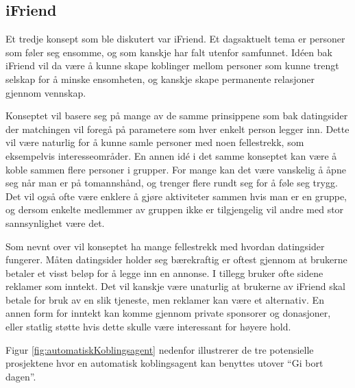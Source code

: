 \subsection{iFriend}
Et tredje konsept som ble diskutert var iFriend. Et dagsaktuelt tema er personer som føler seg ensomme, og som kanskje har falt utenfor samfunnet. Idéen bak iFriend vil da være å kunne skape koblinger mellom personer som kunne trengt selskap for å minske ensomheten, og kanskje skape permanente relasjoner gjennom vennskap.

Konseptet vil basere seg på mange av de samme prinsippene som bak datingsider der matchingen vil foregå på parametere som hver enkelt person legger inn. Dette vil være naturlig for å kunne samle personer med noen fellestrekk, som eksempelvis interesseområder. En annen idé i det samme konseptet kan være å koble sammen flere personer i grupper. For mange kan det være vanskelig å åpne seg når man er på tomannshånd, og trenger flere rundt seg for å føle seg trygg. Det vil også ofte være enklere å gjøre aktiviteter sammen hvis man er en gruppe, og dersom enkelte medlemmer av gruppen ikke er tilgjengelig vil andre med stor sannsynlighet være det.

Som nevnt over vil konseptet ha mange fellestrekk med hvordan datingsider fungerer. Måten datingsider holder seg bærekraftig er oftest gjennom at brukerne betaler et visst beløp for å legge inn en annonse. I tillegg bruker ofte sidene reklamer som inntekt. Det vil kanskje være unaturlig at brukerne av iFriend skal betale for bruk av en slik tjeneste, men reklamer kan være et alternativ. En annen form for inntekt kan komme gjennom private sponsorer og donasjoner, eller statlig støtte hvis dette skulle være interessant for høyere hold.

Figur \ref{fig:automatiskKoblingsagent} nedenfor illustrerer de tre potensielle prosjektene hvor en automatisk koblingsagent kan benyttes utover “Gi bort dagen”.


